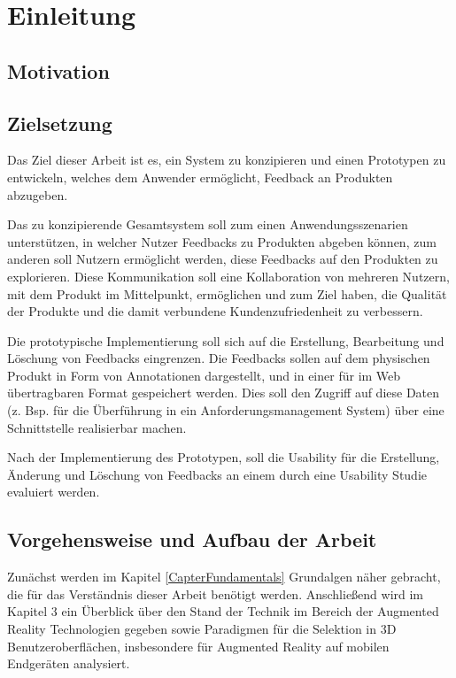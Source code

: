 \chapter{Einleitung}

\section{Motivation}


\section{Zielsetzung}

Das Ziel dieser Arbeit ist es, ein System zu konzipieren und einen Prototypen zu entwickeln, welches dem Anwender ermöglicht, Feedback an Produkten
abzugeben. 

Das zu konzipierende Gesamtsystem soll zum einen Anwendungsszenarien unterstützen, in welcher Nutzer Feedbacks zu Produkten abgeben können, 
zum anderen soll Nutzern ermöglicht werden, diese Feedbacks auf den Produkten zu explorieren. 
Diese Kommunikation soll eine Kollaboration von mehreren Nutzern, mit dem Produkt im Mittelpunkt, ermöglichen und zum Ziel haben, die Qualität der 
Produkte und die damit verbundene Kundenzufriedenheit zu verbessern.

Die prototypische Implementierung soll sich auf die Erstellung, Bearbeitung und Löschung von Feedbacks eingrenzen. Die Feedbacks sollen auf dem physischen 
Produkt in Form von Annotationen dargestellt, und in einer für im Web übertragbaren Format gespeichert werden. Dies soll den Zugriff auf diese Daten 
(z. Bsp. für die Überführung in ein Anforderungsmanagement System) über eine Schnittstelle realisierbar machen.  

Nach der Implementierung des Prototypen, soll die Usability für die Erstellung, Änderung und Löschung von Feedbacks an einem durch 
eine Usability Studie evaluiert werden. 

\section{Vorgehensweise und Aufbau der Arbeit}

Zunächst werden im Kapitel \ref{CapterFundamentals} Grundalgen näher gebracht, die für das Verständnis dieser Arbeit benötigt werden. Anschließend wird 
im Kapitel 3 ein Überblick über den Stand der Technik im Bereich der Augmented Reality Technologien gegeben sowie Paradigmen für die Selektion in 3D Benutzeroberflächen, 
insbesondere für Augmented Reality auf mobilen Endgeräten analysiert.  
 
